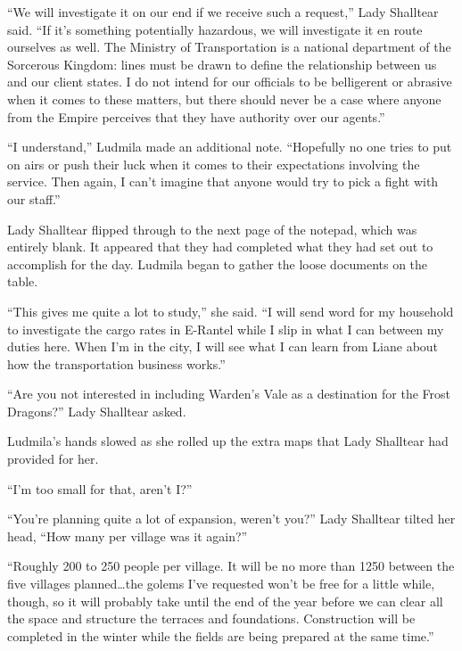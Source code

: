  

“We will investigate it on our end if we receive such a request,” Lady Shalltear said. “If it’s something potentially hazardous, we will investigate it en route ourselves as well. The Ministry of Transportation is a national department of the Sorcerous Kingdom: lines must be drawn to define the relationship between us and our client states. I do not intend for our officials to be belligerent or abrasive when it comes to these matters, but there should never be a case where anyone from the Empire perceives that they have authority over our agents.”

 

“I understand,” Ludmila made an additional note. “Hopefully no one tries to put on airs or push their luck when it comes to their expectations involving the service. Then again, I can’t imagine that anyone would try to pick a fight with our staff.”

 

Lady Shalltear flipped through to the next page of the notepad, which was entirely blank. It appeared that they had completed what they had set out to accomplish for the day. Ludmila began to gather the loose documents on the table.

 

“This gives me quite a lot to study,” she said. “I will send word for my household to investigate the cargo rates in E-Rantel while I slip in what I can between my duties here. When I’m in the city, I will see what I can learn from Liane about how the transportation business works.”

 

“Are you not interested in including Warden’s Vale as a destination for the Frost Dragons?” Lady Shalltear asked.

 

Ludmila’s hands slowed as she rolled up the extra maps that Lady Shalltear had provided for her.

 

“I’m too small for that, aren’t I?”

 

“You’re planning quite a lot of expansion, weren’t you?” Lady Shalltear tilted her head, “How many per village was it again?”

 

“Roughly 200 to 250 people per village. It will be no more than 1250 between the five villages planned…the golems I’ve requested won’t be free for a little while, though, so it will probably take until the end of the year before we can clear all the space and structure the terraces and foundations. Construction will be completed in the winter while the fields are being prepared at the same time.”

